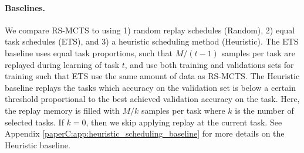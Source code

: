 \vspace{-3mm}
\paragraph{Baselines.} We compare RS-MCTS to using 1) random replay schedules (Random), 2) equal task schedules (ETS), and 3) a heuristic scheduling method (Heuristic). The ETS baseline uses equal task proportions, such that $M/(t-1)$ samples per task are replayed during learning of task $t$, and use both training and validations sets for training such that ETS use the same amount of data as RS-MCTS. %
The Heuristic baseline replays the tasks which accuracy on the validation set is below a certain threshold proportional to the best achieved validation accuracy on the task. Here, the replay memory is filled with $M/k$ samples per task where $k$ is the number of selected tasks. If $k=0$, then we skip applying replay at the current task.  
See Appendix \ref{paperC:app:heuristic_scheduling_baseline} for more details on the Heuristic baseline. 


\begin{table}[t]
	\footnotesize
	\centering
	\caption{
		Performance comparison with ACC between RS-MCTS (Ours), Random scheduling (Random), Equal Task Schedule (ETS), and Heuristic Scheduling (Heuristic) with various memory selection methods evaluated across all datasets. We provide the metrics for training on all seen task datasets jointly (Joint) as an upper bound, as well as include the results from a breadth-first search (BFS) with Uniform memory selection for the 5-task datasets. 
		Replay memory sizes are $M=10$ and $M=100$ for the 5-task and 10/20-task datasets respectively. We report the mean and standard deviation averaged over 5 seeds. Ours performs better or on par with the baselines on most datasets and selection methods, where MoF yields the best results %
		in general.
	}
	\vspace{-3mm}
	\resizebox{0.98\textwidth}{!}{ %
	
	}
\vspace{-3mm}
\label{tab:results_memory_selection_methods}
\end{table}

